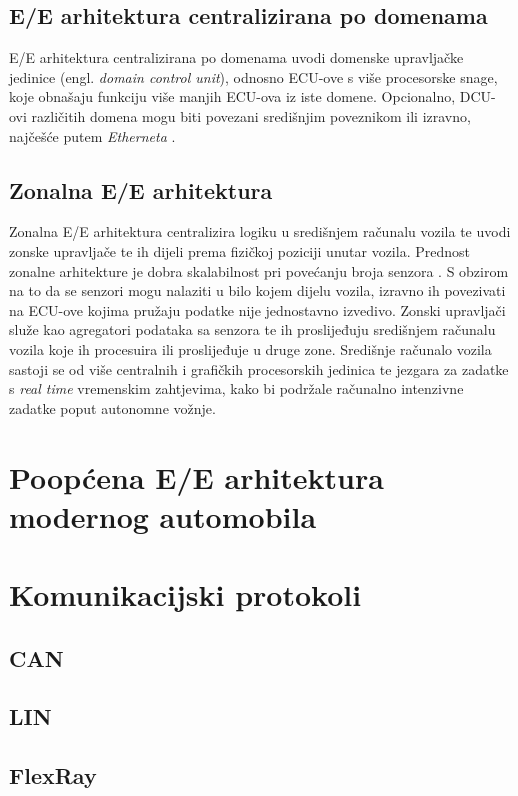 \documentclass[times, utf8, diplomski, numeric]{fer}
\begin{document}
\subsection{E/E arhitektura centralizirana po domenama}
E/E arhitektura centralizirana po domenama uvodi domenske upravljačke jedinice (engl. \textit{domain control unit}), odnosno ECU-ove s više procesorske snage, koje obnašaju funkciju više manjih ECU-ova iz iste domene. Opcionalno, DCU-ovi različitih domena mogu biti povezani središnjim poveznikom ili izravno, najčešće putem \textit{Etherneta} \cite{bosch2022handbook, nasser2023automotive}.

\subsection{Zonalna E/E arhitektura}
Zonalna E/E arhitektura centralizira logiku u središnjem računalu vozila  te uvodi zonske upravljače te ih dijeli prema fizičkoj poziciji unutar vozila. Prednost zonalne arhitekture je dobra skalabilnost pri povećanju broja senzora \cite{bosch2022handbook}. S obzirom na to da se senzori mogu nalaziti u bilo kojem dijelu vozila, izravno ih povezivati na ECU-ove kojima pružaju podatke nije jednostavno izvedivo. Zonski upravljači služe kao agregatori podataka sa senzora te ih proslijeđuju središnjem računalu vozila koje ih procesuira ili proslijeđuje u druge zone. Središnje računalo vozila sastoji se od više centralnih i grafičkih procesorskih jedinica te jezgara za zadatke s \textit{real time} vremenskim zahtjevima, kako bi podržale računalno intenzivne zadatke poput autonomne vožnje\cite{nasser2023automotive}.
\section{Poopćena E/E arhitektura modernog automobila}
\section{Komunikacijski protokoli}
\subsection{CAN}
\subsection{LIN}
\subsection{FlexRay}
\end{document}
